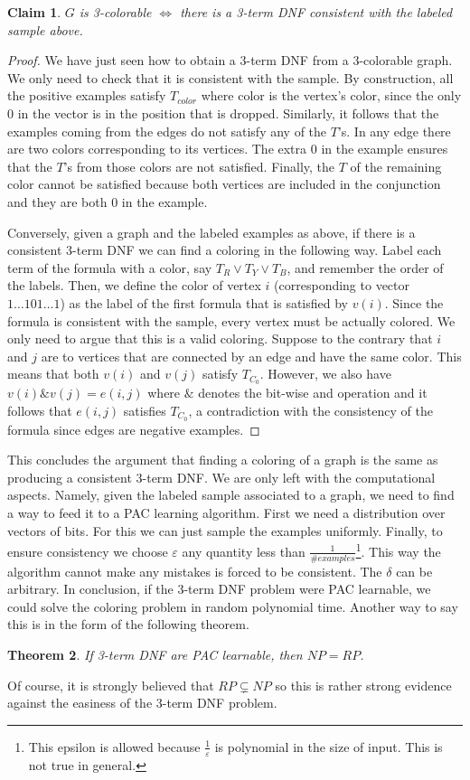 \documentclass[12pt, letterpaper]{article}
\numberwithin{equation}{section} %
\newcommand{\ve}{\varepsilon}
\newtheorem{theorem}{Theorem}[section]
\newtheorem{claim}[theorem]{Claim}
\theoremstyle{definition}
\theoremstyle{remark}
\begin{document}
\begin{claim}
    $G$ is 3-colorable $\iff$ there is a 3-term DNF \emph{consistent} with the labeled sample above.
\end{claim}
\begin{proof}
    We have just seen how to obtain a 3-term DNF from a 3-colorable graph. We only need to check that it is consistent with the sample.
    By construction, all the positive examples satisfy $T_{color}$ where color is the vertex's color, since the only 0 in the vector is in the position that is dropped.
    Similarly, it follows that the examples coming from the edges do not satisfy any of the $T$'s. In any edge there are two colors corresponding to its vertices.
    The extra 0 in the example ensures that the $T$'s from those colors are not satisfied.
    Finally, the $T$ of the remaining color cannot be satisfied because both vertices are included in the conjunction and they are both 0 in the example.

    Conversely, given a graph and the labeled examples as above, if there is a consistent 3-term DNF we can find a coloring in the following way.
    Label each term of the formula with a color, say $T_R \lor T_Y \lor T_B$, and remember the order of the labels.
    Then, we define the color of vertex $i$ (corresponding to vector $1\ldots101\ldots1$) as the label of the first formula that is satisfied by $v(i)$.
    Since the formula is consistent with the sample, every vertex must be actually colored. We only need to argue that this is a valid coloring.
    Suppose to the contrary that $i$ and $j$ are to vertices that are connected by an edge and have the same color.
    This means that both $v(i)$ and $v(j)$ satisfy $T_{C_0}$.
    However, we also have $v(i) \& v(j) = e(i,j)$  where $\&$ denotes the bit-wise and operation and it follows that $e(i,j)$ satisfies $T_{C_0}$, a contradiction with the consistency of the formula since edges are negative examples.
\end{proof}

This concludes the argument that finding a coloring of a graph is the same as producing a consistent 3-term DNF.
We are only left with the computational aspects.
Namely, given the labeled sample associated to a graph, we need to find a way to feed it to a PAC learning algorithm.
First we need a distribution over vectors of bits.
For this we can just sample the examples uniformly.
Finally, to ensure consistency we choose $\ve$ any quantity less than $\frac1{\#examples}$\footnote{This epsilon is allowed because $\frac1\ve$ is polynomial in the size of input. This is not true in general.}. This way the algorithm cannot make any mistakes is forced to be consistent. The $\delta$ can be arbitrary.
In conclusion, if the 3-term DNF problem were PAC learnable, we could solve the coloring problem in random polynomial time.
Another way to say this is in the form of the following theorem.
\begin{theorem}
    If 3-term DNF are PAC learnable, then $NP = RP$.
\end{theorem}
Of course, it is strongly believed that $RP \subsetneq NP$ so this is rather strong evidence against the easiness of the 3-term DNF problem.
\end{document}

